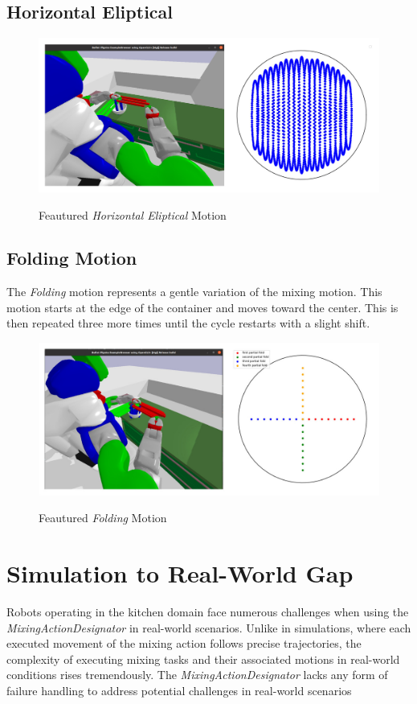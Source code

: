 \subsection*{Horizontal Eliptical}
\begin{figure}[H]
    \includegraphics[scale=0.3]{Graphics/horizontal_eliptical_chart.jpg}
    \label{fig:circularshowcase}
    \caption{Feautured \textit{Horizontal Eliptical} Motion}
\end{figure}

\subsection*{Folding Motion}
The \textit{Folding} motion represents a gentle variation of the mixing motion. This motion starts at the edge of the container and moves toward the center. This is then repeated three more times until the cycle restarts with a slight shift.
\begin{figure}[H]
    \includegraphics[scale=0.3]{Graphics/folding_showcase.jpg}
    \label{fig:foldingshowcase}
    \caption{Feautured \textit{Folding} Motion}
\end{figure} 

\section{Simulation to Real-World Gap}
\label{sec: simulation to real world gap}
Robots operating in the kitchen domain face numerous challenges when using the \textit{MixingActionDesignator} in real-world scenarios. 
Unlike in simulations, where each executed movement of the mixing action follows precise trajectories, 
the complexity of executing mixing tasks and their associated motions in real-world conditions rises tremendously. 
The \textit{MixingActionDesignator} lacks any form of failure handling to address potential challenges in real-world scenarios

